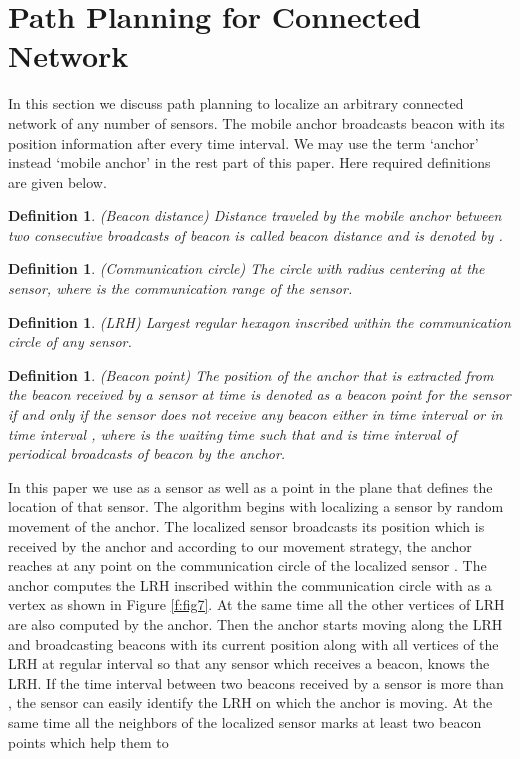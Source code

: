 \documentclass[preprint,11pt]{elsarticle}
\newtheorem{definition}[theorem]{Definition}
\begin{document}
\section{Path Planning for Connected Network}
\label{sec:tech1}
In this section we discuss path planning to localize an arbitrary connected network of any number of sensors.
The mobile anchor broadcasts beacon with its position information after every  time interval.
We may use the term `anchor' instead `mobile anchor' in the rest part of this paper. Here required definitions are given below.
\begin{definition}
{\rm(}Beacon distance{\rm)} Distance traveled by the mobile anchor between two consecutive broadcasts
of beacon is called {\it beacon distance} and is denoted by .
\end{definition}
\begin{definition}
{\rm(}Communication circle{\rm)} The circle with radius  centering at the sensor, where  is the communication range of the sensor.
\end{definition}
\begin{definition}
{\rm(}LRH{\rm)} Largest regular hexagon inscribed within the communication circle of any sensor.
\end{definition}
\begin{definition}
{\rm(}Beacon point{\rm)}
The position of the anchor that is extracted from the beacon received by a sensor at time  is denoted as a beacon point for the sensor if and only if the sensor does not receive any beacon either in time interval  or in time interval , where  is the waiting time such that  and  is time interval of periodical broadcasts of beacon by the anchor.
\end{definition}
In this paper we use  as a sensor as well as a point in the plane that defines the location of that sensor.
The algorithm begins with localizing a sensor  by random movement of the anchor.
The localized sensor broadcasts its position which is received by the anchor and according to our movement strategy,
the anchor reaches at any point  on the communication circle of the localized sensor .
The anchor computes the LRH inscribed within the communication circle with  as a vertex as shown in Figure \ref{f:fig7}. At the same time all the other vertices of LRH are also computed by the anchor. Then the anchor starts moving along the LRH and broadcasting beacons with its current position along with all vertices of the LRH at regular interval so that any sensor which receives a beacon, knows the LRH.
If the time interval between two beacons received by a sensor is more than , the sensor can easily identify the LRH on which the anchor is moving. At the same time all the neighbors of the localized sensor  marks at least two beacon points which help them to
\end{document}
